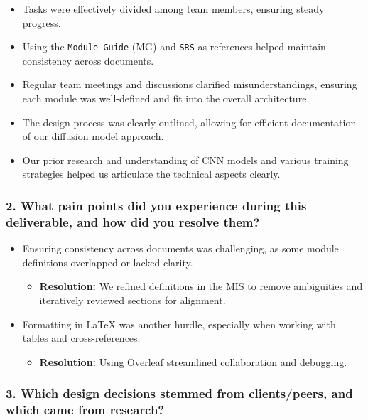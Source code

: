\documentclass[12pt, titlepage]{article}
\begin{document}
\begin{itemize}
    \item Tasks were effectively divided among team members, ensuring steady progress.
    \item Using the \texttt{Module Guide} (MG) and \texttt{SRS} as references helped maintain consistency across documents.
    \item Regular team meetings and discussions clarified misunderstandings, ensuring each module was well-defined and fit into the overall architecture.
    \item The design process was clearly outlined, allowing for efficient documentation of our diffusion model approach.
    \item Our prior research and understanding of CNN models and various training strategies helped us articulate the technical aspects clearly.
\end{itemize}

\subsubsection{2. What pain points did you experience during this deliverable, and how did you resolve them?}
\label{sec:painpoints}

\begin{itemize}
    \item Ensuring consistency across documents was challenging, as some module definitions overlapped or lacked clarity. 
    \begin{itemize}
        \item \textbf{Resolution:} We refined definitions in the MIS to remove ambiguities and iteratively reviewed sections for alignment.
    \end{itemize}
    \item Formatting in LaTeX was another hurdle, especially when working with tables and cross-references.
    \begin{itemize}
        \item \textbf{Resolution:} Using Overleaf streamlined collaboration and debugging.
    \end{itemize}
\end{itemize}

\subsubsection{3. Which design decisions stemmed from clients/peers, and which came from research?}
\label{sec:designdecisions}
\end{document}
